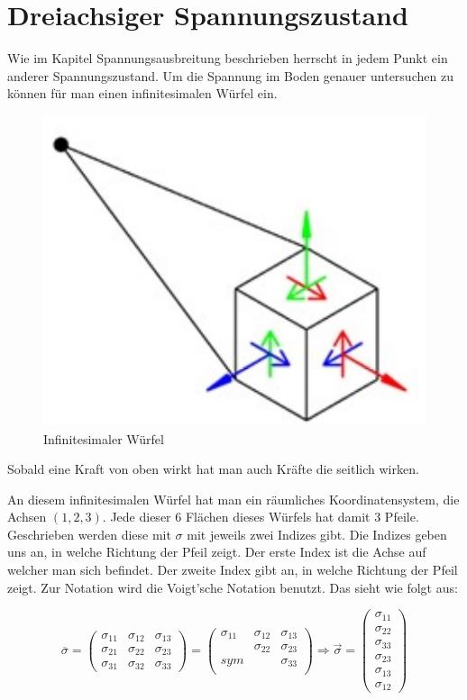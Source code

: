\section{Dreiachsiger Spannungszustand\label{spannung:section:Dreiachsiger_Spannungszustand}}
Wie im Kapitel Spannungsausbreitung beschrieben herrscht in jedem Punkt ein anderer Spannungszustand.
Um die Spannung im Boden genauer untersuchen zu können für man einen infinitesimalen Würfel ein.
\begin{figure}
	\centering
	\includegraphics[width=0.5\linewidth,keepaspectratio]{papers/spannung/Grafiken/infinitesimalerWuerfel.jpg}
	\caption{Infinitesimaler Würfel}
	\label{fig:infintesimaler-wurfel}
\end{figure}

Sobald eine Kraft von oben wirkt hat man auch Kräfte die seitlich wirken.

An diesem infinitesimalen Würfel hat man ein räumliches Koordinatensystem, die Achsen $(1,2,3)$.
Jede dieser 6 Flächen dieses Würfels hat damit 3 Pfeile.
Geschrieben werden diese mit $\sigma$ mit jeweils zwei Indizes gibt.
Die Indizes geben uns an, in welche Richtung der Pfeil zeigt.
Der erste Index ist die Achse auf welcher man sich befindet.
Der zweite Index gibt an, in welche Richtung der Pfeil zeigt.
Zur Notation wird die Voigt'sche Notation benutzt. Das sieht wie folgt aus:

\[
\overline{\sigma}
=
\begin{pmatrix}
	\sigma_{11} & \sigma_{12} & \sigma_{13} \\ 
	\sigma_{21} & \sigma_{22} & \sigma_{23} \\
	\sigma_{31} & \sigma_{32} & \sigma_{33}
\end{pmatrix}
=
\begin{pmatrix}
	\sigma_{11} & \sigma_{12} & \sigma_{13} \\ 
	& \sigma_{22} & \sigma_{23} \\
	sym &  & \sigma_{33} \\ 
\end{pmatrix}
\Rightarrow
\overrightarrow{\sigma}
=
\begin{pmatrix}
  \sigma_{11}\\
	\sigma_{22}\\
	\sigma_{33}\\
	\sigma_{23}\\
	\sigma_{13}\\
	\sigma_{12}
\end{pmatrix}
\]


